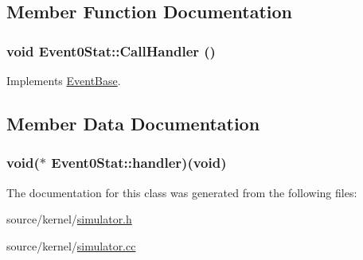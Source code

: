 \subsection{Member Function Documentation}
\hypertarget{classEvent0Stat_0cf3e0d44a1c04ee73a8a93a50ca05a1}{
\subsubsection[{CallHandler}]{\setlength{\rightskip}{0pt plus 5cm}void Event0Stat::CallHandler ()}}
\label{classEvent0Stat_0cf3e0d44a1c04ee73a8a93a50ca05a1}




Implements \hyperlink{classEventBase_121ca64dec88c8d9589c064b0060d037}{EventBase}.

\subsection{Member Data Documentation}
\hypertarget{classEvent0Stat_6638fffbc4b497e2e8368d5e5f057db1}{
\subsubsection[{handler}]{\setlength{\rightskip}{0pt plus 5cm}void($\ast$ {\bf Event0Stat::handler})(void)}}
\label{classEvent0Stat_6638fffbc4b497e2e8368d5e5f057db1}




The documentation for this class was generated from the following files:\begin{CompactItemize}
\item 
source/kernel/\hyperlink{simulator_8h}{simulator.h}\item 
source/kernel/\hyperlink{simulator_8cc}{simulator.cc}\end{CompactItemize}

